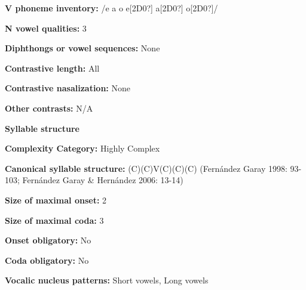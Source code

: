 \begin{styleBody}
\textbf{V phoneme inventory:} /e a o e[2D0?] a[2D0?] o[2D0?]/
\end{styleBody}

\begin{styleBody}
\textbf{N vowel qualities:} 3
\end{styleBody}

\begin{styleBody}
\textbf{Diphthongs or vowel sequences:} None
\end{styleBody}

\begin{styleBody}
\textbf{Contrastive length:} All
\end{styleBody}

\begin{styleBody}
\textbf{Contrastive nasalization:} None
\end{styleBody}

\begin{styleBody}
\textbf{Other contrasts:} N/A
\end{styleBody}

\begin{styleBody}
\textbf{Syllable structure}
\end{styleBody}

\begin{styleBody}
\textbf{Complexity Category:} Highly Complex
\end{styleBody}

\begin{styleBody}
\textbf{Canonical syllable structure:} (C)(C)V(C)(C)(C)\textbf{ }(Fernández Garay 1998: 93-103; Fernández Garay \& Hernández 2006: 13-14)
\end{styleBody}

\begin{styleBody}
\textbf{Size of maximal onset:} 2
\end{styleBody}

\begin{styleBody}
\textbf{Size of maximal coda:} 3
\end{styleBody}

\begin{styleBody}
\textbf{Onset obligatory:} No
\end{styleBody}

\begin{styleBody}
\textbf{Coda obligatory:} No
\end{styleBody}

\begin{styleBody}
\textbf{Vocalic nucleus patterns:} Short vowels, Long vowels
\end{styleBody}

